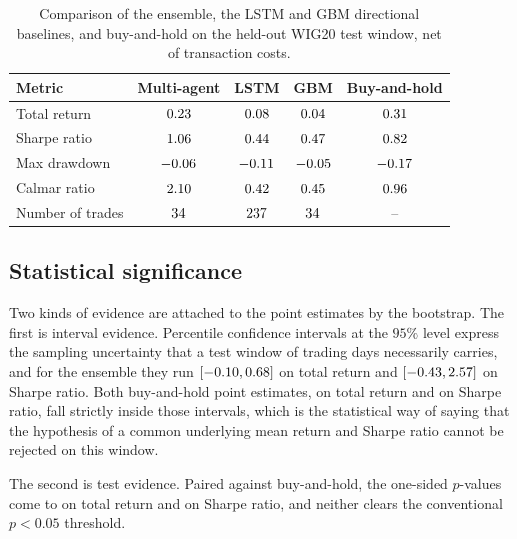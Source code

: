 \begin{table}[!htbp]
\centering
\small
\caption{Comparison of the ensemble, the LSTM and GBM directional baselines, and buy-and-hold on the held-out WIG20 test window, net of transaction costs.}
\label{tab:lstm}
\begin{tabular}{lcccc}
\toprule
\textbf{Metric} & \textbf{Multi-agent} & \textbf{LSTM} & \textbf{GBM} & \textbf{Buy-and-hold} \\
\midrule
Total return     & $0.23$   & $0.08$   & $0.04$   & $0.31$ \\
Sharpe ratio     & $1.06$   & $0.44$ & $0.47$ & $0.82$ \\
Max drawdown     & $-0.06$  & $-0.11$    & $-0.05$    & $-0.17$ \\
Calmar ratio     & $2.10$ & $0.42$ & $0.45$ & $0.96$ \\
Number of trades & $34$  & $237$ & $34$ & -- \\
\bottomrule
\end{tabular}
\end{table}

\subsection{Statistical significance}\label{subsec:significance}

Two kinds of evidence are attached to the point estimates by the bootstrap. The first is interval evidence. Percentile confidence intervals at the $95\%$ level express the sampling uncertainty that a test window of \OOSDays{} trading days necessarily carries, and for the ensemble they run $[-0.10, 0.68]$ on total return and $[-0.43, 2.57]$ on Sharpe ratio. Both buy-and-hold point estimates, \BHtest{} on total return and \BHsharpe{} on Sharpe ratio, fall strictly inside those intervals, which is the statistical way of saying that the hypothesis of a common underlying mean return and Sharpe ratio cannot be rejected on this window.

The second is test evidence. Paired against buy-and-hold, the one-sided $p$-values come to \PvsBH{} on total return and \PvsBHsharpe{} on Sharpe ratio, and neither clears the conventional $p < 0.05$ threshold.

